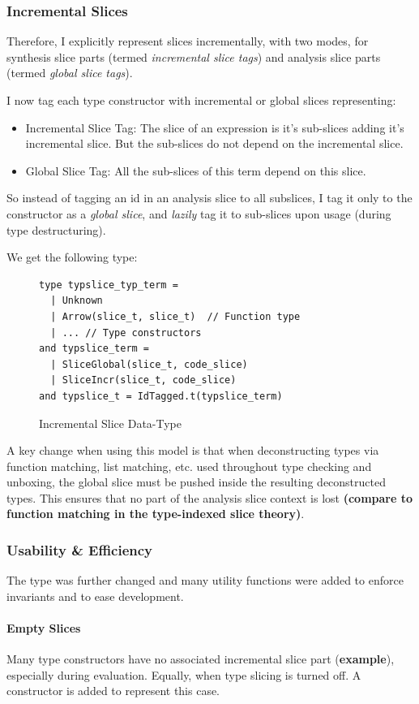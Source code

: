 \subsubsection{Incremental Slices}
Therefore, I explicitly represent slices incrementally, with two modes, for synthesis slice parts (termed \textit{incremental slice tags}) and analysis slice parts (termed \textit{global slice tags}).

I now tag each type constructor with incremental or global slices representing:
\begin{itemize}
\item Incremental Slice Tag: The slice of an expression is it's sub-slices adding it's incremental slice. But the sub-slices do not depend on the incremental slice.
\item Global Slice Tag: All the sub-slices of this term depend on this slice.
\end{itemize}
So instead of tagging an id in an analysis slice to all subslices, I tag it only to the constructor as a \textit{global slice}, and \textit{lazily} tag it to sub-slices upon usage (during type destructuring).

We get the following type:
\begin{figure}[h]
\begin{verbatim}
type typslice_typ_term = 
  | Unknown
  | Arrow(slice_t, slice_t)  // Function type
  | ... // Type constructors
and typslice_term = 
  | SliceGlobal(slice_t, code_slice)
  | SliceIncr(slice_t, code_slice)
and typslice_t = IdTagged.t(typslice_term)
\end{verbatim}
\caption{Incremental Slice Data-Type}
\end{figure}

A key change when using this model is that when deconstructing types via function matching, list matching, etc. used throughout type checking and unboxing, the global slice must be pushed inside the resulting deconstructed types. This ensures that no part of the analysis slice context is lost \textbf{(compare to function matching in the type-indexed slice theory)}. 


\subsubsection{Usability \& Efficiency}
The type was further changed and many utility functions were added to enforce invariants and to ease development.

\paragraph{Empty Slices} 
Many type constructors have no associated incremental slice part (\textbf{example}), especially during evaluation. Equally, when type slicing is turned off. A  constructor is added to represent this case.

